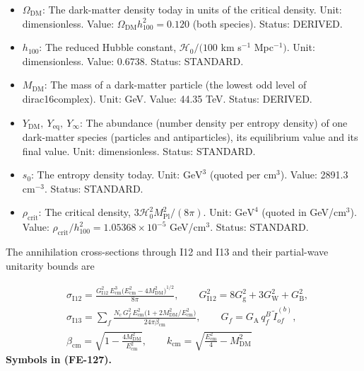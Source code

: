 \documentclass[
  10pt,
]{article}
\providecommand{\tightlist}{%
  \setlength{\itemsep}{0pt}\setlength{\parskip}{0pt}}
\begin{document}
\begin{itemize}
\tightlist
\item
  \(\Omega_{\mathrm{DM}}\): The dark-matter density today in units of
  the critical density. Unit: dimensionless. Value:
  \(\Omega_{\mathrm{DM}}h_{100}^2 = 0.120\) (both species). Status:
  DERIVED.
\item
  \(h_{100}\): The reduced Hubble constant, \(\mathcal{H}_0/(100\) km
  s\(^{-1}\) Mpc\(^{-1})\). Unit: dimensionless. Value: 0.6738. Status:
  STANDARD.
\item
  \(M_{\mathrm{DM}}\): The mass of a dark-matter particle (the lowest
  odd level of dirac16complex). Unit: GeV. Value: 44.35 TeV. Status:
  DERIVED.
\item
  \(Y_{\mathrm{DM}},\ Y_{\mathrm{eq}},\ Y_\infty\): The abundance
  (number density per entropy density) of one dark-matter species
  (particles and antiparticles), its equilibrium value and its final
  value. Unit: dimensionless. Status: STANDARD.
\item
  \(s_0\): The entropy density today. Unit: \(\mathrm{GeV}^{3}\) (quoted
  per \(\mathrm{cm}^{3}\)). Value: 2891.3 cm\(^{-3}\). Status: STANDARD.
\item
  \(\rho_{\mathrm{crit}}\): The critical density,
  \(3\mathcal{H}_0^2M_{\mathrm{Pl}}^2/(8\pi)\). Unit:
  \(\mathrm{GeV}^{4}\) (quoted in GeV/\(\mathrm{cm}^{3}\)). Value:
  \(\rho_{\mathrm{crit}}/h_{100}^2 = 1.05368\times10^{-5}\)
  GeV/cm\(^3\). Status: STANDARD.
\end{itemize}

The annihilation cross-sections through I12 and I13 and their
partial-wave unitarity bounds are

\[
\begin{aligned}
&\sigma_{\mathrm{I12}} = \frac{G_{\mathrm{I12}}^2\,E_{\mathrm{cm}}^3\big(E_{\mathrm{cm}}^2 -
 4M_{\mathrm{DM}}^2\big)^{1/2}}{8\pi},\qquad
 G_{\mathrm{I12}}^2 = 8G_{\mathrm{g}}^2 + 3G_{\mathrm{W}}^2 + G_{\mathrm{B}}^2,\\
&\sigma_{\mathrm{I13}} = \sum_f\frac{N_{\mathrm{c}}\,G_f^2\,E_{\mathrm{cm}}^2\big(1 +
 2M_{\mathrm{DM}}^2/E_{\mathrm{cm}}^2\big)}{24\pi\beta_{\mathrm{cm}}},
 \qquad G_f = G_{\mathrm{A}}\,q^{B}_f\,\tilde I^{(b)}_{of},\\
&\beta_{\mathrm{cm}} = \sqrt{1 - \frac{4M_{\mathrm{DM}}^2}{E_{\mathrm{cm}}^2}},\qquad
 k_{\mathrm{cm}} = \sqrt{\frac{E_{\mathrm{cm}}^2}{4} - M_{\mathrm{DM}}^2}
\end{aligned} \tag{FE-127}
\] \textbf{Symbols in (FE-127).}
\end{document}
